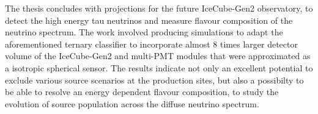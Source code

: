 The thesis concludes with projections for the future IceCube-Gen2 observatory, to detect the high energy tau neutrinos and measure flavour composition of the neutrino spectrum. The work involved producing simulations to adapt the aforementioned ternary classifier to incorporate almost 8 times larger detector volume of the IceCube-Gen2 and multi-PMT modules that were approximated as a isotropic spherical sensor. The results indicate not only an excellent potential to exclude various source scenarios at the production sites, but also a possibilty to be able to resolve an energy dependent flavour composition, to study the evolution of source population across the diffuse neutrino spectrum.
